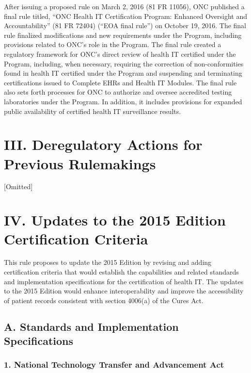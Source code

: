 \documentclass[twoside,11pt]{article}
\begin{document}


          After issuing a proposed rule on March 2, 2016 (81 FR 11056), ONC published a final rule titled, “ONC Health IT Certification Program: Enhanced Oversight and Accountability” (81 FR 72404) (“EOA final rule”) on October 19, 2016. The final rule finalized modifications and new requirements under the Program, including provisions related to ONC's role in the Program. The final rule created a regulatory framework for ONC's direct review of health IT certified under the Program, including, when necessary, requiring the correction of non-conformities found in health IT certified under the Program and suspending and terminating certifications issued to Complete EHRs and Health IT Modules. The final rule also sets forth processes for ONC to authorize and oversee accredited testing laboratories under the Program. In addition, it includes provisions for expanded public availability of certified health IT surveillance results.


          \section{III. Deregulatory Actions for Previous Rulemakings}

[Omitted]

          \section{IV. Updates to the 2015 Edition Certification Criteria}

          This rule proposes to update the 2015 Edition by revising and adding certification criteria that would establish the capabilities and related standards and implementation specifications for the certification of health IT. The updates to the 2015 Edition would enhance interoperability and improve the accessibility of patient records consistent with section 4006(a) of the Cures Act.


          \subsection{A. Standards and Implementation Specifications}

          \subsubsection{1. National Technology Transfer and Advancement Act}
\end{document}
